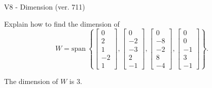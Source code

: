 \begin{exercise}
  \begin{exerciseTitle}V8 - Dimension (ver. 711)\end{exerciseTitle}
  \begin{exerciseStatement}
    Explain how to find the dimension of 
\[W=\mathrm{span}\ \left\{\left[\begin{array}{r}
0 \\
2 \\
1 \\
-2 \\
1
\end{array}\right] , \left[\begin{array}{r}
0 \\
-2 \\
-3 \\
2 \\
-1
\end{array}\right] , \left[\begin{array}{r}
0 \\
-8 \\
-2 \\
8 \\
-4
\end{array}\right] , \left[\begin{array}{r}
0 \\
0 \\
-1 \\
3 \\
-1
\end{array}\right]\right\}.\]



  \end{exerciseStatement}
  \begin{exerciseAnswer}
   The dimension of \(W\) is  \(3\).
  


  \end{exerciseAnswer}
\end{exercise}